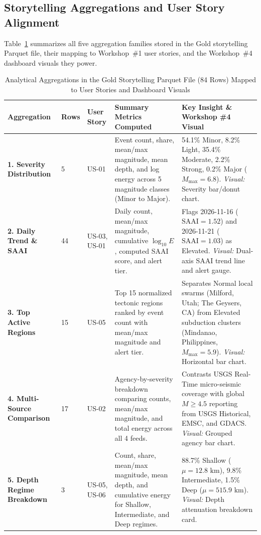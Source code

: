 \subsection{Storytelling Aggregations and User Story Alignment}
Table~\ref{tab:storytelling_aggs} summarizes all five aggregation families stored in the Gold storytelling Parquet file, their mapping to Workshop~\#1 user stories, and the Workshop~\#4 dashboard visuals they power.

\begin{table}[!t]
\centering
\caption{Analytical Aggregations in the Gold Storytelling Parquet File (84 Rows) Mapped to User Stories and Dashboard Visuals}
\label{tab:storytelling_aggs}
\footnotesize
\renewcommand{\arraystretch}{1.15}
\begin{tabularx}{\textwidth}{p{2.5cm} p{0.7cm} p{1.6cm} p{4.5cm} X}
\toprule
\textbf{Aggregation} & \textbf{Rows} & \textbf{User Story} & \textbf{Summary Metrics Computed} & \textbf{Key Insight \& Workshop \#4 Visual} \\
\midrule
\textbf{1. Severity Distribution} & 5 & US-01 & Event count, share, mean/max magnitude, mean depth, and log energy across 5 magnitude classes (Minor to Major). & 54.1\% Minor, 8.2\% Light, 35.4\% Moderate, 2.2\% Strong, 0.2\% Major ($M_{\max}=6.8$). \textit{Visual:} Severity bar/donut chart. \\
\textbf{2. Daily Trend \& SAAI} & 44 & US-03, US-01 & Daily count, mean/max magnitude, cumulative $\log_{10} E$, computed SAAI score, and alert tier. & Flags 2026-11-16 ($\text{SAAI}=1.52$) and 2026-11-21 ($\text{SAAI}=1.03$) as Elevated. \textit{Visual:} Dual-axis SAAI trend line and alert gauge. \\
\textbf{3. Top Active Regions} & 15 & US-05 & Top 15 normalized tectonic regions ranked by event count with mean/max magnitude and alert tier. & Separates Normal local swarms (Milford, Utah; The Geysers, CA) from Elevated subduction clusters (Mindanao, Philippines, $M_{\max}=5.9$). \textit{Visual:} Horizontal bar chart. \\
\textbf{4. Multi-Source Comparison} & 17 & US-02 & Agency-by-severity breakdown comparing counts, mean/max magnitude, and total energy across all 4 feeds. & Contrasts USGS Real-Time micro-seismic coverage with global $M \ge 4.5$ reporting from USGS Historical, EMSC, and GDACS. \textit{Visual:} Grouped agency bar chart. \\
\textbf{5. Depth Regime Breakdown} & 3 & US-05, US-06 & Count, share, mean/max magnitude, mean depth, and cumulative energy for Shallow, Intermediate, and Deep regimes. & 88.7\% Shallow ($\mu=12.8\text{ km}$), 9.8\% Intermediate, 1.5\% Deep ($\mu=515.9\text{ km}$). \textit{Visual:} Depth attenuation breakdown card. \\
\bottomrule
\end{tabularx}
\end{table}
